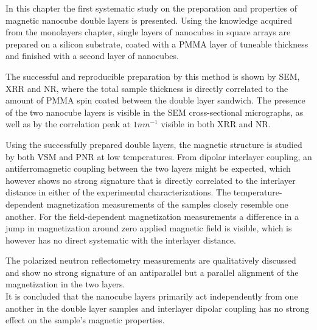 \documentclass[\main/dresen_thesis.tex]{subfiles}
\begin{document}
  In this chapter the first systematic study on the preparation and properties of magnetic nanocube double layers is presented.
  Using the knowledge acquired from the monolayers chapter, single layers of nanocubes in square arrays are prepared on a silicon substrate, coated with a PMMA layer of tuneable thickness and finished with a second layer of nanocubes.

  The successful and reproducible preparation by this method is shown by SEM, XRR and NR, where the total sample thickness is directly correlated to the amount of PMMA spin coated between the double layer sandwich.
  The presence of the two nanocube layers is visible in the SEM cross-sectional micrographs, as well as by the correlation peak at $1 \unit{nm^{-1}}$ visible in both XRR and NR.

  Using the successfully prepared double layers, the magnetic structure is studied by both VSM and PNR at low temperatures.
  From dipolar interlayer coupling, an antiferromagnetic coupling between the two layers might be expected, which however shows no strong signature that is directly correlated to the interlayer distance in either of the experimental characterizations.
  The temperature-dependent magnetization measurements of the samples closely resemble one another.
  For the field-dependent magnetization measurements a difference in a jump in magnetization around zero applied magnetic field is visible, which is however has no direct systematic with the interlayer distance.

  The polarized neutron reflectometry measurements are qualitatively discussed and show no strong signature of an antiparallel but a parallel alignment of the magnetization in the two layers.
  \\

  It is concluded that the nanocube layers primarily act independently from one another in the double layer samples and interlayer dipolar coupling has no strong effect on the sample's magnetic properties.
\end{document}
